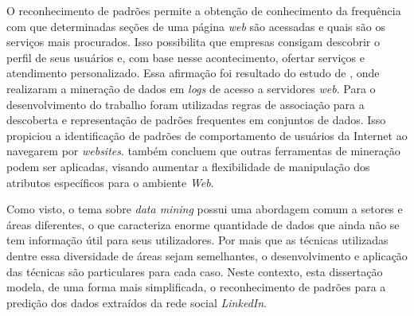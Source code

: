 O reconhecimento de padrões permite a obtenção de conhecimento da frequência com que determinadas seções de uma página \textit{web} são acessadas e quais são os serviços mais procurados. Isso possibilita que empresas consigam descobrir o perfil de seus usuários e, com base nesse acontecimento, ofertar serviços e atendimento personalizado. Essa afirmação foi resultado do estudo de , onde realizaram a mineração de dados em \textit{logs} de acesso a servidores \textit{web}. Para o desenvolvimento do trabalho foram utilizadas regras de associação para a descoberta e representação de padrões frequentes em conjuntos de dados. Isso propiciou a identificação de padrões de comportamento de usuários da Internet ao navegarem por \textit{websites}.  também concluem que outras ferramentas de mineração podem ser aplicadas, visando aumentar a flexibilidade de manipulação dos atributos específicos para o ambiente \textit{Web}.

Como visto, o tema sobre \textit{data mining} possui uma abordagem comum a setores e áreas diferentes, o que caracteriza enorme quantidade de dados que ainda não se tem informação útil para seus utilizadores. Por mais que as técnicas utilizadas dentre essa diversidade de áreas sejam semelhantes, o desenvolvimento e aplicação das técnicas são particulares para cada caso. Neste contexto, esta dissertação modela, de uma forma mais simplificada, o reconhecimento de padrões para a predição dos dados extraídos da rede social \textit{LinkedIn}.











